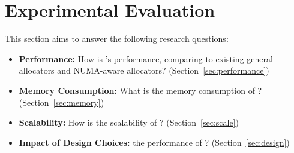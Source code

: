 \section{Experimental Evaluation}
\label{sec:evaluation}

This section aims to answer the following research questions: 

\begin{itemize}
\item \textbf{Performance:} How is \NM{}'s performance, comparing to existing general allocators and NUMA-aware allocators? (Section~\ref{sec:performance}) 
\item \textbf{Memory Consumption:} What is the memory consumption of \NM{}? (Section~\ref{sec:memory})
\item \textbf{Scalability:} How is the scalability of \NM{}? (Section~\ref{sec:scale})
\item \textbf{Impact of Design Choices:}  the performance of \NM{}? (Section~\ref{sec:design})	
\end{itemize}

